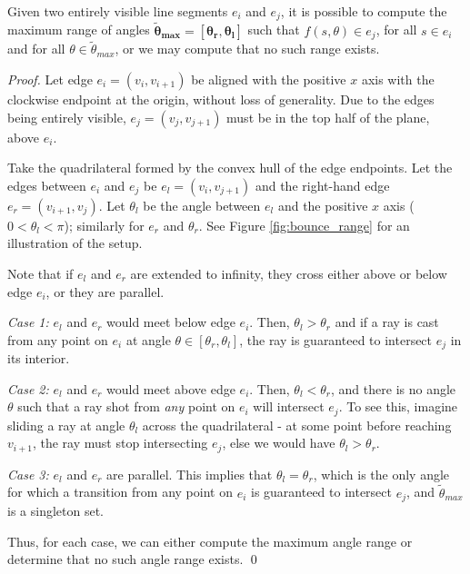 \documentclass[]{styles/svproc}  %
\begin{document}
\begin{proposition} \label{prop:saferange}
Given two entirely visible line segments $e_i$ and $e_j$, it is possible to compute
the maximum range of angles $\bm{\tilde{\theta}_{max} = [\theta_r, \theta_l]}$ such
that $f(s, \theta) \in e_j$, for all $s \in e_i$ and for all
$\theta \in \tilde{\theta}_{max}$, or we may compute that no such range exists.
\end{proposition}

\begin{proof}

Let edge $e_i = (v_i, v_{i+1})$ be aligned with the positive $x$ axis with the clockwise
endpoint at the origin, without loss of generality. Due to the edges being
entirely visible, $e_j = (v_j, v_{j+1})$ must be in the top half of the plane, above
$e_i$.

Take the quadrilateral formed by the convex hull of the edge endpoints.
Let the edges between $e_i$ and $e_j$ be $e_l = (v_i, v_{j+1})$ and the right-hand edge 
$e_r = (v_{i+1}, v_j)$. Let $\theta_{l}$ be
the angle between $e_l$ and the positive $x$ axis ($0 < \theta_l < \pi$); similarly
for $e_r$ and $\theta_r$. See Figure \ref{fig:bounce_range} for an illustration of
the setup. 

Note that if $e_l$ and $e_r$ are extended to infinity,
they cross either above or below edge $e_i$, or they are parallel.

\emph{Case 1:} $e_l$ and $e_r$ would meet below edge $e_i$. Then,
$\theta_l > \theta_r$ and if a ray is cast from any point on $e_i$ at angle
$\theta \in [\theta_r, \theta_l]$, the ray is guaranteed to intersect $e_j$ in its
interior.

\emph{Case 2:} $e_l$ and $e_r$ would meet above edge $e_i$. Then, $\theta_l <
\theta_r$, and there is no angle
$\theta$ such that a ray shot from \emph{any} point on $e_i$ will intersect
$e_j$.
To see this, imagine sliding a ray at angle $\theta_l$ across the quadrilateral
- at some point before reaching $v_{i+1}$, the ray must stop intersecting $e_j$,
else we would have $\theta_l > \theta_r$.

\emph{Case 3:} $e_l$ and $e_r$ are parallel. This implies that $\theta_{l} =
\theta_{r}$, which is the only angle for which a transition from any
point on $e_i$ is guaranteed to intersect $e_j$, and $\tilde{\theta}_{max}$ is a
singleton set.

Thus, for each case, we can either compute the maximum angle range or determine
that no such angle range exists.
\qed

\end{proof}
\end{document}
